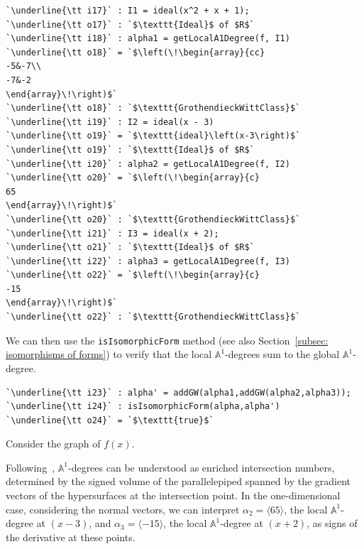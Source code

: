 \documentclass[12pt]{amsart}
\theoremstyle{definition}
\begin{document}
\begin{lstlisting}[language=Macaulay2output]
`\underline{\tt i17}` : I1 = ideal(x^2 + x + 1);
`\underline{\tt o17}` : `$\texttt{Ideal}$ of $R$`
`\underline{\tt i18}` : alpha1 = getLocalA1Degree(f, I1)
`\underline{\tt o18}` = `$\left(\!\begin{array}{cc}
-5&-7\\
-7&-2
\end{array}\!\right)$`
`\underline{\tt o18}` : `$\texttt{GrothendieckWittClass}$`
`\underline{\tt i19}` : I2 = ideal(x - 3)
`\underline{\tt o19}` = `$\texttt{ideal}\left(x-3\right)$`
`\underline{\tt o19}` : `$\texttt{Ideal}$ of $R$`
`\underline{\tt i20}` : alpha2 = getLocalA1Degree(f, I2)
`\underline{\tt o20}` = `$\left(\!\begin{array}{c}
65
\end{array}\!\right)$`
`\underline{\tt o20}` : `$\texttt{GrothendieckWittClass}$`
`\underline{\tt i21}` : I3 = ideal(x + 2);
`\underline{\tt o21}` : `$\texttt{Ideal}$ of $R$`
`\underline{\tt i22}` : alpha3 = getLocalA1Degree(f, I3)
`\underline{\tt o22}` = `$\left(\!\begin{array}{c}
-15
\end{array}\!\right)$`
`\underline{\tt o22}` : `$\texttt{GrothendieckWittClass}$`
\end{lstlisting}
We can then use the \texttt{isIsomorphicForm} method (see also Section~\ref{subsec: isomorphisms of forms}) to verify that the local $\mathbb{A}^{1}$-degrees sum to the global $\mathbb{A}^{1}$-degree.

\begin{lstlisting}[language=Macaulay2output]
`\underline{\tt i23}` : alpha' = addGW(alpha1,addGW(alpha2,alpha3));
`\underline{\tt i24}` : isIsomorphicForm(alpha,alpha')
`\underline{\tt o24}` = `$\texttt{true}$`
\end{lstlisting}

Consider the graph of $f(x)$. 
\begin{center}
\end{center}
Following~\cite[Theorem 1.2]{McKean}, $\mathbb{A}^{1}$-degrees can be understood as enriched intersection numbers, determined by the signed volume of the parallelepiped spanned by the gradient vectors of the hypersurfaces at the intersection point. In the one-dimensional case, considering the normal vectors, we can interpret $\alpha_{2}=\langle65\rangle$, the local $\mathbb{A}^{1}$-degree at $(x-3)$, and $\alpha_{3}=\langle-15\rangle$, the local $\mathbb{A}^{1}$-degree at $(x+2)$, as signs of the derivative at these points. 
\end{document}
